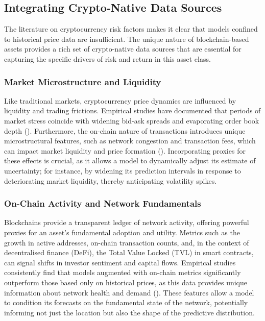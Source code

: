 \documentclass[
  a4paper,
  DIV=11,
  numbers=noendperiod]{scrreprt}
\begin{document}
\subsection{Integrating Crypto-Native Data
Sources}\label{integrating-crypto-native-data-sources}

The literature on cryptocurrency risk factors makes it clear that models
confined to historical price data are insufficient. The unique nature of
blockchain-based assets provides a rich set of crypto-native data
sources that are essential for capturing the specific drivers of risk
and return in this asset class.

\subsubsection{Market Microstructure and
Liquidity}\label{market-microstructure-and-liquidity}

Like traditional markets, cryptocurrency price dynamics are influenced
by liquidity and trading frictions. Empirical studies have documented
that periods of market stress coincide with widening bid-ask spreads and
evaporating order book depth (). Furthermore, the on-chain nature of transactions introduces
unique microstructural features, such as network congestion and
transaction fees, which can impact market liquidity and price formation
().
Incorporating proxies for these effects is crucial, as it allows a model
to dynamically adjust its estimate of uncertainty; for instance, by
widening its prediction intervals in response to deteriorating market
liquidity, thereby anticipating volatility spikes.

\subsubsection{On-Chain Activity and Network
Fundamentals}\label{on-chain-activity-and-network-fundamentals}

Blockchains provide a transparent ledger of network activity, offering
powerful proxies for an asset's fundamental adoption and utility.
Metrics such as the growth in active addresses, on-chain transaction
counts, and, in the context of decentralised finance (DeFi), the Total
Value Locked (TVL) in smart contracts, can signal shifts in investor
sentiment and capital flows. Empirical studies consistently find that
models augmented with on-chain metrics significantly outperform those
based only on historical prices, as this data provides unique
information about network health and demand
(). These
features allow a model to condition its forecasts on the fundamental
state of the network, potentially informing not just the location but
also the shape of the predictive distribution.
\end{document}
